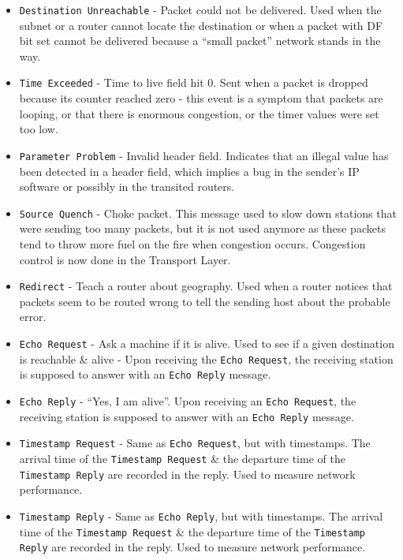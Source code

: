 \documentclass[11pt]{article}
\begin{document}
\begin{itemize}
    \item   \verb|Destination Unreachable| - Packet could not be delivered. 
            Used when the subnet or a router cannot locate the destination or when a packet with DF bit set cannot be delivered because a ``small packet'' network stands in the way.
    \item   \verb|Time Exceeded| - Time to live field hit 0. 
            Sent when a packet is dropped because its counter reached zero - this event is a symptom that packets are looping, or that there is enormous congestion, or the timer values were set too low.
    \item   \verb|Parameter Problem| - Invalid header field. 
            Indicates that an illegal value has been detected in a header field, which implies a bug in the sender's IP software or possibly in the transited routers.
    \item   \verb|Source Quench| - Choke packet.
            This message used to slow down stations that were sending too many packets, but it is not used anymore as these packets tend to throw more fuel on the fire when congestion occurs. 
            Congestion control is now done in the Transport Layer.
    \item   \verb|Redirect| - Teach a router about geography. 
            Used when a router notices that packets seem to be routed wrong to tell the sending host about the probable error.
    \item   \verb|Echo Request| - Ask a machine if it is alive.
            Used to see if a given destination is reachable \& alive - Upon receiving the \verb|Echo Request|, the receiving station is supposed to answer with an \verb|Echo Reply| message.
    \item   \verb|Echo Reply| - ``Yes, I am alive''. 
            Upon receiving an \verb|Echo Request|, the receiving station is supposed to answer with an \verb|Echo Reply| message.
    \item   \verb|Timestamp Request| -  Same as \verb|Echo Request|, but with timestamps.
            The arrival time of the \verb|Timestamp Request| \& the departure time of the \verb|Timestamp Reply| are recorded in the reply. 
            Used to measure network performance.
    \item   \verb|Timestamp Reply| -  Same as \verb|Echo Reply|, but with timestamps.
            The arrival time of the \verb|Timestamp Request| \& the departure time of the \verb|Timestamp Reply| are recorded in the reply. 
            Used to measure network performance.
\end{itemize}
\end{document}
